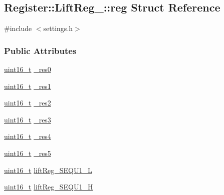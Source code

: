 \hypertarget{structRegister_1_1LiftReg___1_1reg}{}\subsection{Register\+:\+:Lift\+Reg\+\_\+\+:\+:reg Struct Reference}
\label{structRegister_1_1LiftReg___1_1reg}


{\ttfamily \#include $<$settings.\+h$>$}

\subsubsection*{Public Attributes}
\begin{DoxyCompactItemize}
\item 
\mbox{\hyperlink{settings_8h_a017dd44e68049ffdd31500a8cd01ba68}{uint16\+\_\+t}} \mbox{\hyperlink{structRegister_1_1LiftReg___1_1reg_ab25ba9f2c2c2a594e76fc265f001f4c3}{\+\_\+res0}}
\item 
\mbox{\hyperlink{settings_8h_a017dd44e68049ffdd31500a8cd01ba68}{uint16\+\_\+t}} \mbox{\hyperlink{structRegister_1_1LiftReg___1_1reg_a9a6e86d214f5f12d0c4ccbfadb05d266}{\+\_\+res1}}
\item 
\mbox{\hyperlink{settings_8h_a017dd44e68049ffdd31500a8cd01ba68}{uint16\+\_\+t}} \mbox{\hyperlink{structRegister_1_1LiftReg___1_1reg_a31d9aba368ee70b89c1f1a22f5f74622}{\+\_\+res2}}
\item 
\mbox{\hyperlink{settings_8h_a017dd44e68049ffdd31500a8cd01ba68}{uint16\+\_\+t}} \mbox{\hyperlink{structRegister_1_1LiftReg___1_1reg_ab9dfd5f798a01cf60799ccc5b166118f}{\+\_\+res3}}
\item 
\mbox{\hyperlink{settings_8h_a017dd44e68049ffdd31500a8cd01ba68}{uint16\+\_\+t}} \mbox{\hyperlink{structRegister_1_1LiftReg___1_1reg_a6b13b563a1392b1789e5755926b4719f}{\+\_\+res4}}
\item 
\mbox{\hyperlink{settings_8h_a017dd44e68049ffdd31500a8cd01ba68}{uint16\+\_\+t}} \mbox{\hyperlink{structRegister_1_1LiftReg___1_1reg_ab4e03952d2c903ad6af751f0f5642deb}{\+\_\+res5}}
\item 
\mbox{\hyperlink{settings_8h_a017dd44e68049ffdd31500a8cd01ba68}{uint16\+\_\+t}} \mbox{\hyperlink{structRegister_1_1LiftReg___1_1reg_a648684417d8dc08e4dc3b47c76a5079e}{lift\+Reg\+\_\+\+S\+E\+Q\+U1\+\_\+L}}
\item 
\mbox{\hyperlink{settings_8h_a017dd44e68049ffdd31500a8cd01ba68}{uint16\+\_\+t}} \mbox{\hyperlink{structRegister_1_1LiftReg___1_1reg_a131cf647f5827bb944dbe95ae2d9546e}{lift\+Reg\+\_\+\+S\+E\+Q\+U1\+\_\+H}}

\end{DoxyCompactItemize}
